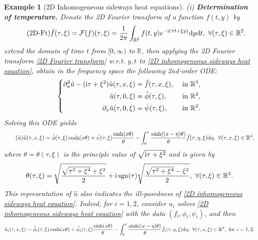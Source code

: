 \documentclass[oneside]{article}
\numberwithin{equation}{section}
\newtheorem{example}{Example}[section]
\begin{document}
\begin{example}[2D Inhomogeneous sideways heat equations]
    \noindent(i) \textbf{Determination of temperature.} Denote the 2D Fourier transform of a function $f(t,y)$ by
    \begin{align}
        \label{2D Fourier transform}
        \tag{2D-Ft}
        \hat{f}(\tau,\xi) = \mathcal{F}(f)(\tau,\xi) = \frac{1}{2\pi}\int_{\mathbb{R}^2} f(t,y)e^{-{\rm i}(\tau t + \xi y)}{\rm d}y{\rm d}t,\ \forall(\tau,\xi)\in\mathbb{R}^2.
    \end{align}
    extend the domain of time $t$ from $[0,\infty)$ to $\mathbb{R}$, then applying the 2D Fourier transform \eqref{2D Fourier transform} w.r.t. $y,t$ to \eqref{2D inhomogeneous sideways heat equation}, obtain in the frequency space the following 2nd-order ODE:
    \begin{equation*}
        \left\{\begin{split}
            \partial_x^2\hat{u} - ({\rm i}\tau + \xi^2)\hat{u}(\tau,x,\xi) &= \hat{f}(\tau,x,\xi), &&\mbox{ in } \mathbb{R}^3,\\
            \hat{u}(\tau,0,\xi) &= \hat{\phi}(\tau,\xi), &&\mbox{ in } \mathbb{R}^2,\\
            \partial_x\hat{u}(\tau,0,\xi) &= \hat{\psi}(\tau,\xi), &&\mbox{ in } \mathbb{R}^2.
        \end{split}\right.
    \end{equation*}
    Solving this ODE yields
    \begin{align}
        \label{Fourier transform of solution of 2D inhomogeneous sideways heat equation}
        \tag{$\hat{u}$}
        \hat{u}(\tau,x,\xi) = \hat{\phi}(\tau,\xi)\cosh(x\theta) + \hat{\psi}(\tau,\xi)\frac{\sinh(x\theta)}{\theta} - \int_0^x \frac{\sinh((x - \eta)\theta)}{\theta}\hat{f}(\tau,\eta,\xi){\rm d}\eta,\ \forall(\tau,x,\xi)\in\mathbb{R}^3,
    \end{align}
    where $\theta = \theta(\tau,\xi)$ is the principle value of $\sqrt{{\rm i}\tau + \xi^2}$ and is given by
    \begin{align*}
        \theta(\tau,\xi) = \sqrt{\frac{\sqrt{\tau^2 + \xi^4} + \xi^2}{2}} + {\rm i}\operatorname{sgn}(\tau)\sqrt{\frac{\sqrt{\tau^2 + \xi^4} - \xi^2}{2}},\ \forall(\tau,\xi)\in\mathbb{R}^2.
    \end{align*}
    This representation of $\hat{u}$ also indicates the ill-posedness of \eqref{2D inhomogeneous sideways heat equation}. Indeed, for $i = 1,2$, consider $u_i$ solves \eqref{2D inhomogeneous sideways heat equation} with the data $(f_i,\phi_i,\psi_i)$, and then
    \begin{align*}
        \hat{u}_i(\tau,x,\xi) = \hat{\phi}_i(\tau,\xi)\cosh(x\theta) + \hat{\psi}_i(\tau,\xi)\frac{\sinh(x\theta)}{\theta} - \int_0^x \frac{\sinh((x - \eta)\theta)}{\theta}\hat{f}_i(\tau,\eta,\xi){\rm d}\eta,\ \forall(\tau,x,\xi)\in\mathbb{R}^3, \mbox{ for } i = 1,2.

\end{align*}
\end{example}
\end{document}
